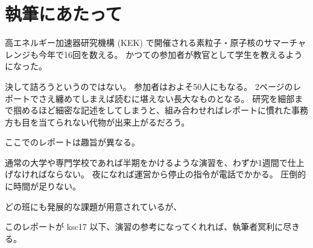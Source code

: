 \section*{執筆にあたって}

高エネルギー加速器研究機構 (KEK) で開催される素粒子・原子核のサマーチャレンジも今年で16回を数える。
かつての参加者が教官として学生を教えるようになった。


決して詰ろうというのではない。
参加者はおよそ50人にもなる。
2ページのレポートでさえ纏めてしまえば読むに堪えない長大なものとなる。
研究を細部まで掴めるほど細密な記述をしてしまうと、組み合わせればレポートに慣れた事務方も目を当てられない代物が出来上がるだろう。

ここでのレポートは趣旨が異なる。

通常の大学や専門学校であれば半期をかけるような演習を、わずか1週間で仕上げなければならない。
夜になれば運営から停止の指令が電話でかかる。
圧倒的に時間が足りない。

どの班にも発展的な課題が用意されているが、

このレポートが ksc17 以下、演習の参考になってくれれば、執筆者冥利に尽きる。
